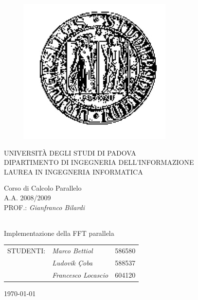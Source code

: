 \begin{titlepage}

		\thispagestyle{empty}
    \begin{figure}
    \centering
    \includegraphics[scale=0.45]{immagini/tesi_logounipd2}
    \end{figure}
    
    \vskip 1.5cm{
    \begin{center}\sc
        UNIVERSIT\`A DEGLI STUDI DI PADOVA\\
        DIPARTIMENTO DI INGEGNERIA DELL'INFORMAZIONE\\
        LAUREA IN INGEGNERIA INFORMATICA\end{center}
		}
		
		\vskip1.2cm\begin{center}
    	\rm\large\expandafter{Corso di Calcolo Parallelo\\}
      \rm\large\uppercase\expandafter{A.A. 2008/2009\\}
      \rm\large\uppercase\expandafter{Prof.:}
    	\emph{Gianfranco Bilardi}\end{center}
    	
    \vskip1.6cm\begin{center}
    \HRule \\[0.4cm]\LARGE\expandafter{Implementazione della FFT parallela}
    \HRule \\[0.4cm]
    \end{center}
    
    \begin{flushright}\vskip2.0cm 
    \begin{tabular}{rll}
	   \rm\large \uppercase{Studenti:}
	   &\emph{Marco Bettiol} &586580\\
	   & \emph{Ludovik \c{C}oba} &588537\\
	   & \emph{Francesco Locascio} &604120\\
		\end{tabular}
		\end{flushright}
    \vfill\begin{center}\today \end{center}
    
\end{titlepage}

\newpage

